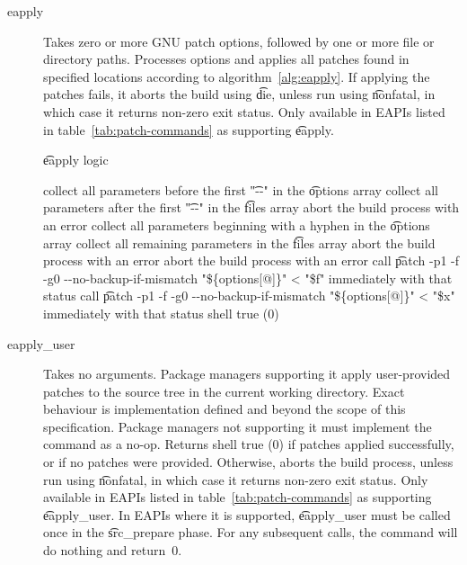 \begin{description}
\item[eapply]  Takes zero or more GNU patch options, followed by one or more
    file or directory paths. Processes options and applies all patches found in specified locations
    according to algorithm~\ref{alg:eapply}. If applying the patches fails, it aborts the build
    using \t{die}, unless run using \t{nonfatal}, in which case it returns non-zero exit status.
    Only available in EAPIs listed in table~\ref{tab:patch-commands} as supporting \t{eapply}.

\begin{algorithm}
\caption{\t{eapply} logic} \label{alg:eapply}
\begin{algorithmic}[1]
    \STATE collect all parameters before the first \t{"-{}-"} in the \t{options} array
    \STATE collect all parameters after the first \t{"-{}-"} in the \t{files} array
    \STATE abort the build process with an error
\ELSE
    \STATE collect all parameters beginning with a hyphen in the \t{options} array
    \STATE collect all remaining parameters in the \t{files} array
\ENDIF
{}
    \STATE abort the build process with an error
\ENDIF
{}
            \STATE abort the build process with an error
        \ENDIF
            \STATE call \t{patch -p1 -f -g0 -{}-no-backup-if-mismatch "\$\{options[@]\}" < "\$f"}
                \RETURN immediately with that status
            \ENDIF
        \ENDFOR
    \ELSE
        \STATE call \t{patch -p1 -f -g0 -{}-no-backup-if-mismatch "\$\{options[@]\}" < "\$x"}
            \RETURN immediately with that status
        \ENDIF
    \ENDIF
\ENDFOR
\RETURN shell true (0)
\end{algorithmic}
\end{algorithm}

\item[eapply_user]  Takes no arguments. Package managers supporting it
    apply user-provided patches to the source tree in the current working directory. Exact behaviour
    is implementation defined and beyond the scope of this specification. Package managers not
    supporting it must implement the command as a no-op. Returns shell true (0) if patches applied
    successfully, or if no patches were provided. Otherwise, aborts the build process, unless run
    using \t{nonfatal}, in which case it returns non-zero exit status. Only available in EAPIs
    listed in table~\ref{tab:patch-commands} as supporting \t{eapply_user}. In EAPIs where it is
    supported, \t{eapply_user} must be called once in the \t{src_prepare} phase. For any
    subsequent calls, the command will do nothing and return~0.
\end{description}


